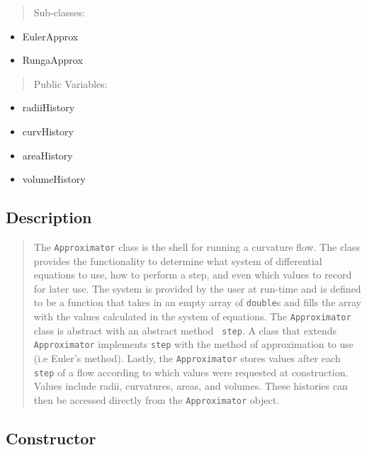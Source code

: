 \begin{quotation}
Sub-classes:
\end{quotation}

\begin{itemize}
\item EulerApprox

\item RungaApprox
\end{itemize}

\begin{quotation}
Public Variables:
\end{quotation}

\begin{itemize}
\item radiiHistory

\item curvHistory

\item areaHistory

\item volumeHistory
\end{itemize}

\subsection*{Description}

\begin{quotation}
The \texttt{Approximator} class is the shell for running a curvature flow.
The class provides the functionality to determine what system of
differential equations to use, how to perform a step, and even which values
to record for later use. The system is provided by the user at run-time and
is defined to be a function that takes in an empty array of \texttt{double}s
and fills the array with the values calculated in the system of equations.
The \texttt{Approximator} class is abstract with an abstract method \texttt{%
step}. A class that extends \texttt{Approximator} implements \texttt{step}
with the method of approximation to use (i.e Euler's method). Lastly, the 
\texttt{Approximator} stores values after each \texttt{step} of a flow
according to which values were requested at construction. Values include
radii, curvatures, areas, and volumes. These histories can then be accessed
directly from the \texttt{Approximator} object.
\end{quotation}

\subsection*{Constructor}

